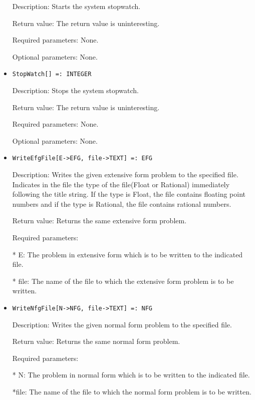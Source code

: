 \begin{itemize}
\bd
\item
[Description:] Starts the system stopwatch.  
\item
[Return value:] The return value is uninteresting.
\item
[Required parameters:] None.
\item
[Optional parameters:] None.
\ed

\item
\begin{verbatim}
StopWatch[] =: INTEGER
\end{verbatim}

\bd
\item
[Description:] Stops the system stopwatch.  
\item
[Return value:] The return value is uninteresting.
\item
[Required parameters:] None.
\item
[Optional parameters:] None.
\ed

\item

\begin{verbatim}
WriteEfgFile[E->EFG, file->TEXT] =: EFG
\end{verbatim}

\bd
\item
[Description:] Writes the given extensive form problem to the specified 
file.  Indicates in the file the type of the file(Float or Rational) 
immediately following the title string.  If the type is Float, the file
contains floating point numbers and if the type is Rational, the file
contains rational numbers.  
\item
[Return value:] Returns the same extensive form problem.
\item
[Required parameters:]\hfil\null

\bd
\item
[* E:] The problem in extensive form which is to be written to the
indicated file.
\item
[* file:] The name of the file to which the extensive form problem is
to be written.
\ed
\ed

\item

\begin{verbatim}
WriteNfgFile[N->NFG, file->TEXT] =: NFG
\end{verbatim}

\bd
\item
[Description:] Writes the given normal form problem to the specified 
file.  
\item
[Return value:] Returns the same normal form problem.
\item
[Required parameters:]\hfil\null

\bd
\item
[* N:] The problem in normal form which is to be written to the
indicated file.

\item
[*file:] The name of the file to which the normal form problem is
to be written.
\ed
\ed
\end{itemize}
